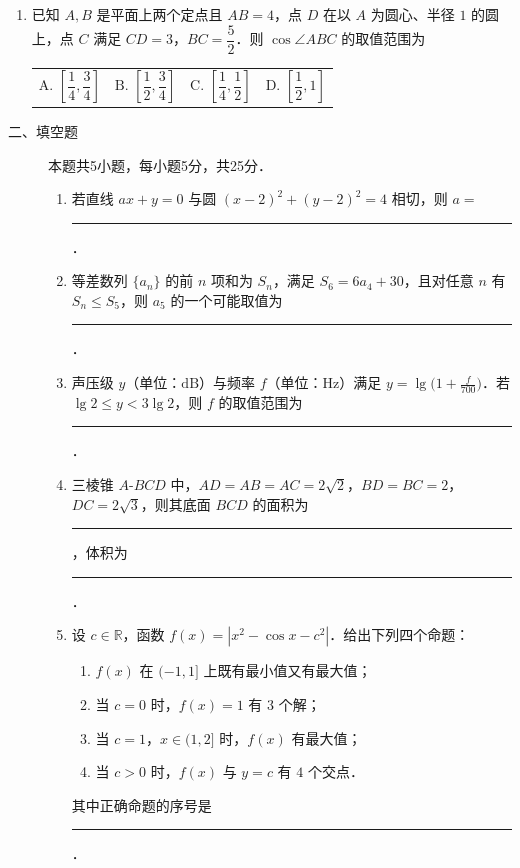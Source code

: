 \begin{description}
\begin{enumerate}[leftmargin=5pt]
        \item 已知 $A,B$ 是平面上两个定点且 $AB=4$，点 $D$ 在以 $A$ 为圆心、半径 $1$ 的圆上，点 $C$ 满足 $CD=3$，$BC=\dfrac{5}{2}$．则 $\cos\angle ABC$ 的取值范围为
       
        {\centering\begin{tabular*}{\linewidth}{@{}@{\extracolsep{\fill}}llll@{}}
          \(\text{A. }\left[\dfrac{1}{4},\dfrac{3}{4}\right]\)  & \(\text{B. }\left[\dfrac{1}{2},\dfrac{3}{4}\right]\)  & \(\text{C. }\left[\dfrac{1}{4},\dfrac{1}{2}\right]\)  & \(\text{D. }\left[\dfrac{1}{2},1\right]\)
        \end{tabular*}\par}
    \end{enumerate}
\end{description}

\begin{description}
    \item[二、填空题] 本题共5小题，每小题5分，共25分．
    \begin{enumerate}[leftmargin=5pt]
      \addtocounter{enumi}{+10}
        \item 若直线 $ax+y=0$ 与圆 $(x-2)^2+(y-2)^2=4$ 相切，则 $a=$ \rule[-0.3ex]{3em}{0.4pt}．
        \item 等差数列 $\{a_n\}$ 的前 $n$ 项和为 $S_n$，满足 $S_6=6a_4+30$，且对任意 $n$ 有 $S_n\leqslant S_5$，则 $a_5$ 的一个可能取值为 \rule[-0.3ex]{3em}{0.4pt}．
        \item 声压级 $y$（单位：$\text{dB}$）与频率 $f$（单位：$\text{Hz}$）满足 $y=\lg\bigl(1+\frac{f}{700}\bigr)$．若 $\lg2\leqslant y<3\lg2$，则 $f$ 的取值范围为 \rule[-0.3ex]{3em}{0.4pt}．
        \item 三棱锥 $A$-$BCD$ 中，$AD=AB=AC=2\sqrt{2}$，$BD=BC=2$，$DC=2\sqrt{3}$，则其底面 $BCD$ 的面积为 \rule[-0.3ex]{3em}{0.4pt}，体积为 \rule[-0.3ex]{3em}{0.4pt}．
        \item 设 $c\in\mathbb{R}$，函数 $f(x)=|x^2-\cos x-c^2|$．给出下列四个命题：
        \begin{enumerate}[label=\textcircled{\arabic*}]
            \item $f(x)$ 在 $(-1,1]$ 上既有最小值又有最大值；
            \item 当 $c=0$ 时，$f(x)=1$ 有 $3$ 个解；
            \item 当 $c=1$，$x\in(1,2]$ 时，$f(x)$ 有最大值；
            \item 当 $c>0$ 时，$f(x)$ 与 $y=c$ 有 $4$ 个交点．
        \end{enumerate}
        其中正确命题的序号是 \rule[-0.3ex]{3em}{0.4pt}．
    \end{enumerate}
\end{description}

